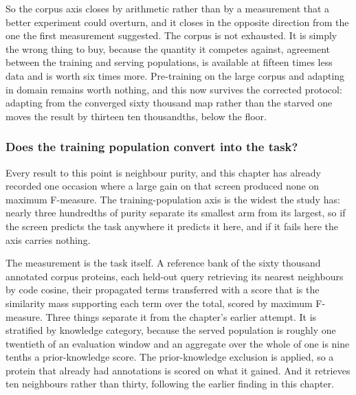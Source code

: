 So the corpus axis closes by arithmetic rather than by a measurement that a better
experiment could overturn, and it closes in the opposite direction from the one the
first measurement suggested. The corpus is not exhausted. It is simply the wrong thing
to buy, because the quantity it competes against, agreement between the training and
serving populations, is available at fifteen times less data and is worth six times more.
Pre-training on the large corpus and adapting in domain remains worth nothing, and this
now survives the corrected protocol: adapting from the converged sixty thousand map
rather than the starved one moves the result by thirteen ten thousandths, below the
floor.

\subsubsection{Does the training population convert into the task?}

Every result to this point is neighbour purity, and this chapter has already recorded one
occasion where a large gain on that screen produced none on maximum F-measure. The
training-population axis is the widest the study has: nearly three hundredths of purity
separate its smallest arm from its largest, so if the screen predicts the task anywhere
it predicts it here, and if it fails here the axis carries nothing.

The measurement is the task itself. A reference bank of the sixty thousand annotated
corpus proteins, each held-out query retrieving its nearest neighbours by code cosine,
their propagated terms transferred with a score that is the similarity mass supporting
each term over the total, scored by maximum F-measure. Three things separate it from the
chapter's earlier attempt. It is stratified by knowledge category, because the served
population is roughly one twentieth of an evaluation window and an aggregate over the
whole of one is nine tenths a prior-knowledge score. The prior-knowledge exclusion is
applied, so a protein that already had annotations is scored on what it gained. And it
retrieves ten neighbours rather than thirty, following the earlier finding in this
chapter.

\begin{table}[htbp]
  \centering
  \caption{Maximum F-measure against the deployed encoder in the served, no-knowledge
  cell, at ten neighbours. Intervals are a paired bootstrap over proteins with the
  measure recomputed inside every resample.}
  \label{tab:exp14-fmax-serving}
  
\end{table}

